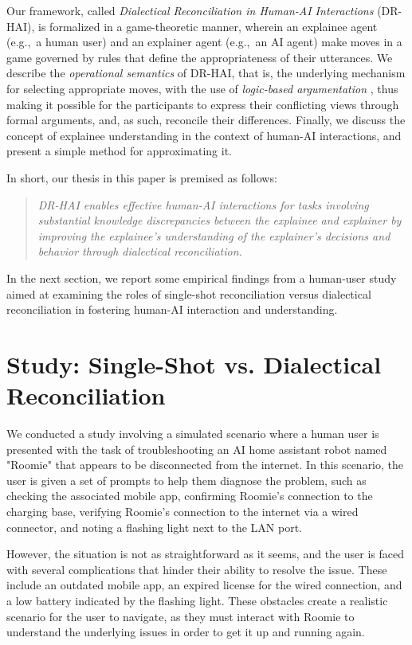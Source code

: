 \documentclass{ecai}
\begin{document}
Our framework, called \emph{Dialectical Reconciliation in Human-AI Interactions} (DR-HAI), is formalized in a game-theoretic manner, wherein an explainee agent (e.g.,~a human user) and an explainer agent (e.g.,~an AI agent) make moves in a game governed by rules that define the appropriateness of their utterances. We describe the \emph{operational semantics} of DR-HAI, that is, the underlying mechanism for selecting appropriate moves, with the use of \emph{logic-based argumentation} \cite{besnard2001logic}, thus making it possible for the participants to express their conflicting views through formal arguments, and, as such, reconcile their differences. Finally, we discuss the concept of explainee understanding in the context of human-AI interactions, and present a simple method for approximating it.




In short, our thesis in this paper is premised as follows:
\begin{quote}

\emph{DR-HAI enables effective human-AI interactions for tasks involving substantial knowledge discrepancies between the explainee and explainer by improving the explainee's understanding of the explainer's decisions and behavior through dialectical reconciliation.}
\end{quote}


In the next section, we report some empirical findings from a human-user study aimed at examining the roles of single-shot reconciliation versus dialectical reconciliation in fostering human-AI interaction and understanding.


\section{Study: Single-Shot vs. Dialectical Reconciliation}

We conducted a study involving a simulated scenario where a human user is presented with the task of troubleshooting an AI home assistant robot named "Roomie" that appears to be disconnected from the internet. In this scenario, the user is given a set of prompts to help them diagnose the problem, such as checking the associated mobile app, confirming Roomie's connection to the charging base, verifying Roomie's connection to the internet via a wired connector, and noting a flashing light next to the LAN port.

However, the situation is not as straightforward as it seems, and the user is faced with several complications that hinder their ability to resolve the issue. These include an outdated mobile app, an expired license for the wired connection, and a low battery indicated by the flashing light. These obstacles create a realistic scenario for the user to navigate, as they must interact with Roomie to understand the underlying issues in order to get it up and running again.
\end{document}
